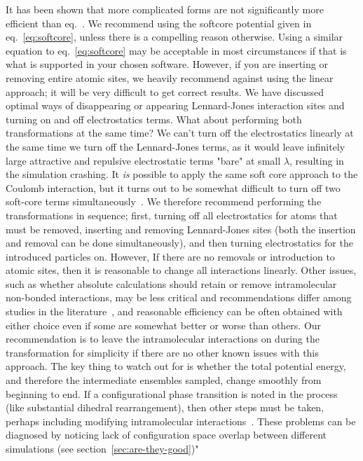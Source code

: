 \documentclass[9pt,bestpractices]{livecoms}
\begin{document}
It has been shown that more complicated forms are not significantly more efficient than eq.~\cite{pham2012optimal}.  We recommend using the softcore potential given in eq.~\ref{eq:softcore}, unless there is a compelling reason otherwise. Using a similar equation to eq.~\ref{eq:softcore} may be acceptable in most circumstances if that is what is supported in your chosen software. However, if you are inserting or removing entire atomic sites, we heavily recommend against using the linear approach; it will be very difficult to get correct results. 
%
We have discussed optimal ways of disappearing or appearing Lennard-Jones interaction sites and turning on and off electrostatics terms. What about performing both transformations at the same time? We can't turn off the electrostatics linearly at the same time we turn off the Lennard-Jones terms, as it would leave infinitely large attractive and repulsive electrostatic terms "bare" at small $\lambda$, resulting in the simulation crashing. It \textit{is} possible to apply the same soft core approach to the Coulomb interaction, but it turns out to be somewhat difficult to turn off two soft-core terms simultaneously~\cite{steinbrecher2011softcore}. We therefore recommend performing the transformations in sequence; first, turning off all electrostatics for atoms that must be removed, inserting and removing Lennard-Jones sites (both the insertion and removal can be done simultaneously), and then turning electrostatics for the introduced particles on. However, If there are no removals or introduction to atomic sites, then it is reasonable to change all interactions linearly. 
%
Other issues, such as whether absolute calculations should retain or remove intramolecular non-bonded interactions, may be less critical and recommendations differ among studies in the literature~\cite{}, and reasonable efficiency can be often obtained with either choice even if some are somewhat better or worse than others. Our recommendation is to leave the intramolecular interactions on during the transformation for simplicity if there are no other known issues with this approach.  The key thing to watch out for is whether the total potential energy, and therefore the intermediate ensembles sampled, change smoothly from beginning to end. If a configurational phase transition is noted in the process (like substantial dihedral rearrangement), then other steps must be taken, perhaps including modifying intramolecular interactions~\cite{???}. These problems can be diagnosed by noticing lack of configuration space overlap between different simulations (see section~\ref{sec:are-they-good})" 
\end{document}
